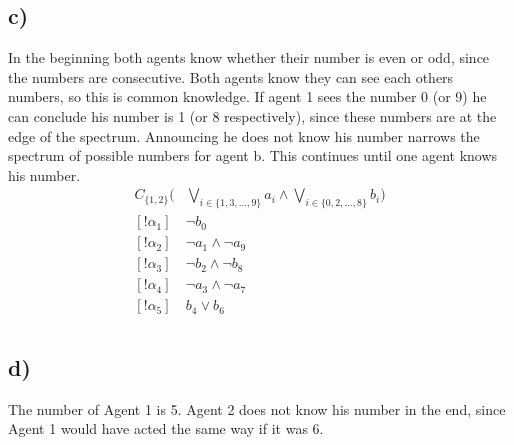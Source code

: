 \documentclass[a4paper]{article}
\begin{document}
\subsection{c)}
In the beginning both agents know whether their number is even or odd, since the numbers are consecutive. Both agents know they can see each others numbers, so this is common knowledge. If agent 1 sees the number 0 (or 9) he can conclude his number is 1 (or 8 respectively), since these numbers are at the edge of the spectrum. Announcing he does not know his number narrows the spectrum of possible numbers for agent b. This continues until one agent knows his number.
\begin{align*}
C_{\{1, 2\}}(&\bigvee_{i \in \{1, 3, ..., 9\}}a_i \land \bigvee_{i \in \{0, 2, ..., 8\}}b_i)\\
[!\alpha_1] & \lnot b_0\\
[!\alpha_2] & \lnot a_1 \land \lnot a_9\\
[!\alpha_3] & \lnot b_2 \land \lnot b_8\\
[!\alpha_4] & \lnot a_3 \land \lnot a_7\\
[!\alpha_5] & b_4 \lor b_6\\
\end{align*}

\subsection{d)}
The number of Agent 1 is 5. Agent 2 does not know his number in the end, since Agent 1 would have acted the same way if it was 6.
\end{document}
